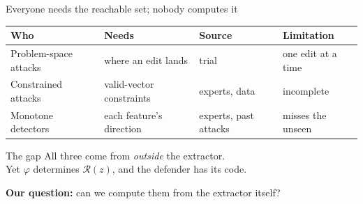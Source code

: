 \documentclass[aspectratio=169,11pt]{beamer}
\begin{document}
\begin{frame}{Everyone needs the reachable set; nobody computes it}
  \renewcommand{\arraystretch}{1.4}\setlength{\tabcolsep}{7pt}
  \begin{center}
  \small\begin{tabular}{@{}llll@{}}
    \toprule
    \textbf{Who} & \textbf{Needs} & \textbf{Source} & \textbf{Limitation} \\
    \midrule
    Problem-space attacks & where an edit lands & trial & one edit at a time \\
    Constrained attacks & valid-vector constraints & experts, data & incomplete \\
    Monotone detectors & each feature's direction & experts, past attacks & misses the unseen \\
    \bottomrule
  \end{tabular}
  \end{center}
  \vfill
  \begin{alertblock}{The gap}
    All three come from \emph{outside} the extractor.\\
    Yet $\varphi$ determines $\mathcal{R}(z)$, and the defender has its code.
  \end{alertblock}
  \vfill
  \begin{center}
    \textbf{Our question:} can we compute them from the extractor itself?
  \end{center}
\end{frame}

\end{document}
